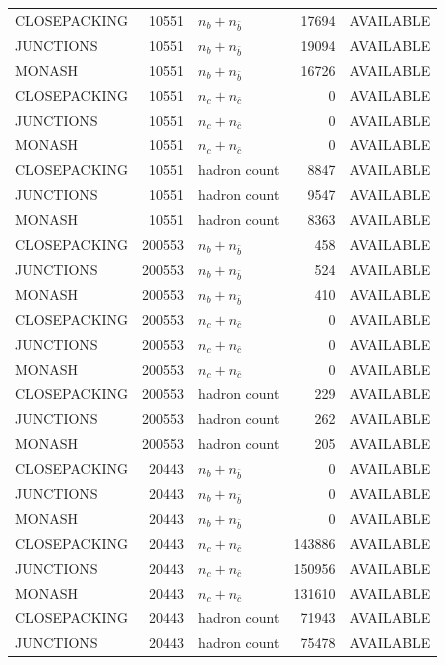\begin{landscape}
\begin{longtable}{@{}lrlrl@{}}
CLOSEPACKING & 10551 & $n_b+n_{\bar b}$ & \num{17694} & AVAILABLE \\
JUNCTIONS & 10551 & $n_b+n_{\bar b}$ & \num{19094} & AVAILABLE \\
MONASH & 10551 & $n_b+n_{\bar b}$ & \num{16726} & AVAILABLE \\
CLOSEPACKING & 10551 & $n_c+n_{\bar c}$ & \num{0} & AVAILABLE \\
JUNCTIONS & 10551 & $n_c+n_{\bar c}$ & \num{0} & AVAILABLE \\
MONASH & 10551 & $n_c+n_{\bar c}$ & \num{0} & AVAILABLE \\
CLOSEPACKING & 10551 & hadron count & \num{8847} & AVAILABLE \\
JUNCTIONS & 10551 & hadron count & \num{9547} & AVAILABLE \\
MONASH & 10551 & hadron count & \num{8363} & AVAILABLE \\
CLOSEPACKING & 200553 & $n_b+n_{\bar b}$ & \num{458} & AVAILABLE \\
JUNCTIONS & 200553 & $n_b+n_{\bar b}$ & \num{524} & AVAILABLE \\
MONASH & 200553 & $n_b+n_{\bar b}$ & \num{410} & AVAILABLE \\
CLOSEPACKING & 200553 & $n_c+n_{\bar c}$ & \num{0} & AVAILABLE \\
JUNCTIONS & 200553 & $n_c+n_{\bar c}$ & \num{0} & AVAILABLE \\
MONASH & 200553 & $n_c+n_{\bar c}$ & \num{0} & AVAILABLE \\
CLOSEPACKING & 200553 & hadron count & \num{229} & AVAILABLE \\
JUNCTIONS & 200553 & hadron count & \num{262} & AVAILABLE \\
MONASH & 200553 & hadron count & \num{205} & AVAILABLE \\
CLOSEPACKING & 20443 & $n_b+n_{\bar b}$ & \num{0} & AVAILABLE \\
JUNCTIONS & 20443 & $n_b+n_{\bar b}$ & \num{0} & AVAILABLE \\
MONASH & 20443 & $n_b+n_{\bar b}$ & \num{0} & AVAILABLE \\
CLOSEPACKING & 20443 & $n_c+n_{\bar c}$ & \num{143886} & AVAILABLE \\
JUNCTIONS & 20443 & $n_c+n_{\bar c}$ & \num{150956} & AVAILABLE \\
MONASH & 20443 & $n_c+n_{\bar c}$ & \num{131610} & AVAILABLE \\
CLOSEPACKING & 20443 & hadron count & \num{71943} & AVAILABLE \\
JUNCTIONS & 20443 & hadron count & \num{75478} & AVAILABLE \\

\end{longtable}
\end{landscape}
